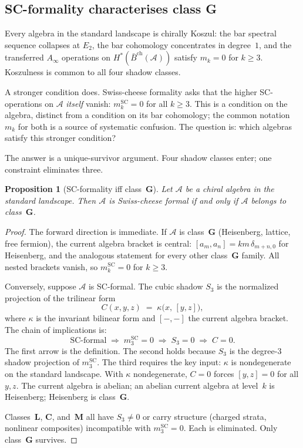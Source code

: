 \documentclass[11pt]{article}
\theoremstyle{plain}
\newtheorem{proposition}[theorem]{Proposition}
\theoremstyle{definition}
\theoremstyle{remark}
\providecommand{\cA}{\mathcal{A}}
\begin{document}
\subsection{SC-formality characterises class G}
\label{ssec:sc-formality}

Every algebra in the standard landscape is chirally Koszul: the
bar spectral sequence collapses at $E_2$, the bar cohomology
concentrates in degree~$1$, and the transferred $A_\infty$
operations on $H^*(\bar{B}^{\mathrm{ch}}(\cA))$ satisfy
$m_k = 0$ for $k \geq 3$. Koszulness is common to all four shadow
classes.

A stronger condition does. Swiss-cheese formality asks that the
higher SC-operations on $\cA$ \emph{itself} vanish:
$m_k^{\mathrm{SC}} = 0$ for all $k \geq 3$. This is a
condition on the algebra, distinct from a condition on its bar cohomology; the common
notation $m_k$ for both is a source of systematic confusion.
The question is: which algebras satisfy this stronger condition?

The answer is a unique-survivor argument. Four shadow classes
enter; one constraint eliminates three.

\begin{proposition}[SC-formality iff class~$\mathbf{G}$]
\label{prop:sc-formality-standalone}
Let $\cA$ be a chiral algebra in the standard landscape.
Then $\cA$ is Swiss-cheese formal if and only if $\cA$ belongs
to class~$\mathbf{G}$.
\end{proposition}

\begin{proof}
The forward direction is immediate.
If $\cA$ is class~$\mathbf{G}$ (Heisenberg, lattice, free
fermion), the current algebra bracket is central:
$[a_m, a_n] = km\,\delta_{m+n,0}$ for Heisenberg, and the
analogous statement for every other class~$\mathbf{G}$ family.
All nested brackets vanish, so $m_k^{\mathrm{SC}} = 0$ for
$k \geq 3$.

Conversely, suppose $\cA$ is SC-formal. The cubic shadow $S_3$ is the normalized projection
of the trilinear form
\[
 C(x,y,z) \;=\; \kappa\bigl(x,\, [y,z]\bigr),
\]
where $\kappa$ is the invariant bilinear form and $[-,-]$ the
current algebra bracket. The chain of implications is:
\[
 \text{SC-formal}
 \;\Longrightarrow\;
 m_3^{\mathrm{SC}} = 0
 \;\Longrightarrow\;
 S_3 = 0
 \;\Longrightarrow\;
 C = 0.
\]
The first arrow is the definition. The second holds because
$S_3$ is the degree-$3$ shadow projection of $m_3^{\mathrm{SC}}$.
The third requires the key input: $\kappa$ is nondegenerate on
the standard landscape. With $\kappa$ nondegenerate, $C = 0$
forces $[y,z] = 0$ for all $y, z$. The current algebra is
abelian; an abelian current algebra at level~$k$ is Heisenberg;
Heisenberg is class~$\mathbf{G}$.

Classes~$\mathbf{L}$, $\mathbf{C}$, and~$\mathbf{M}$ all have
$S_3 \neq 0$ or carry structure (charged strata, nonlinear
composites) incompatible with $m_3^{\mathrm{SC}} = 0$. Each is
eliminated. Only class~$\mathbf{G}$ survives.
\end{proof}
\end{document}
